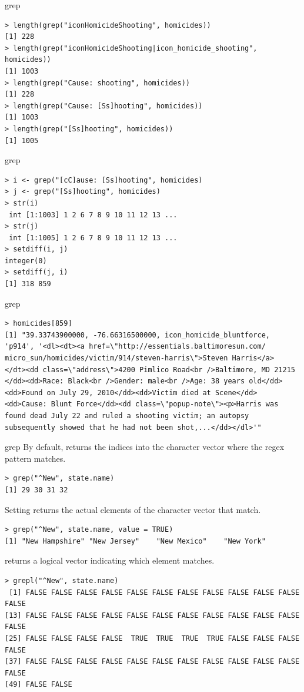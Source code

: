 \documentclass[aspectratio=169]{beamer}
\begin{document}
\begin{frame}[fragile]{grep}

\begin{verbatim}
> length(grep("iconHomicideShooting", homicides))
[1] 228
> length(grep("iconHomicideShooting|icon_homicide_shooting", homicides))
[1] 1003
> length(grep("Cause: shooting", homicides))
[1] 228
> length(grep("Cause: [Ss]hooting", homicides))
[1] 1003
> length(grep("[Ss]hooting", homicides))
[1] 1005
\end{verbatim}

\end{frame}


\begin{frame}[fragile]{grep}
\begin{verbatim}
> i <- grep("[cC]ause: [Ss]hooting", homicides)
> j <- grep("[Ss]hooting", homicides)
> str(i)
 int [1:1003] 1 2 6 7 8 9 10 11 12 13 ...
> str(j)
 int [1:1005] 1 2 6 7 8 9 10 11 12 13 ...
> setdiff(i, j)
integer(0)
> setdiff(j, i)
[1] 318 859
\end{verbatim}
\end{frame}


\begin{frame}[fragile]{grep}
\begin{verbatim}
> homicides[859]
[1] "39.33743900000, -76.66316500000, icon_homicide_bluntforce,
'p914', '<dl><dt><a href=\"http://essentials.baltimoresun.com/
micro_sun/homicides/victim/914/steven-harris\">Steven Harris</a>
</dt><dd class=\"address\">4200 Pimlico Road<br />Baltimore, MD 21215
</dd><dd>Race: Black<br />Gender: male<br />Age: 38 years old</dd>
<dd>Found on July 29, 2010</dd><dd>Victim died at Scene</dd>
<dd>Cause: Blunt Force</dd><dd class=\"popup-note\"><p>Harris was 
found dead July 22 and ruled a shooting victim; an autopsy
subsequently showed that he had not been shot,...</dd></dl>'"
\end{verbatim}
\end{frame}


\begin{frame}[fragile]{grep}
By default,  returns the indices into the character vector
where the regex pattern matches. 
\begin{verbatim}
> grep("^New", state.name)
[1] 29 30 31 32
\end{verbatim}
Setting  returns
the actual elements of the character vector that match.
\begin{verbatim}
> grep("^New", state.name, value = TRUE)
[1] "New Hampshire" "New Jersey"    "New Mexico"    "New York" 
\end{verbatim}
 returns a logical vector indicating which element matches.
\begin{verbatim}
> grepl("^New", state.name)
 [1] FALSE FALSE FALSE FALSE FALSE FALSE FALSE FALSE FALSE FALSE FALSE FALSE
[13] FALSE FALSE FALSE FALSE FALSE FALSE FALSE FALSE FALSE FALSE FALSE FALSE
[25] FALSE FALSE FALSE FALSE  TRUE  TRUE  TRUE  TRUE FALSE FALSE FALSE FALSE
[37] FALSE FALSE FALSE FALSE FALSE FALSE FALSE FALSE FALSE FALSE FALSE FALSE
[49] FALSE FALSE
\end{verbatim}
\end{frame}
\end{document}
